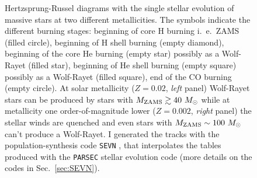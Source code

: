 \documentclass[a4paper,titlepage]{book}     	%
\newcommand{\sun}{\ensuremath{_\odot}}
\newcommand{\mzams}{M_\textup{ZAMS}}
\newcommand{\msun}{\ensuremath{M\sun}}
\begin{document}
\begin{figure}[h!]
\begin{minipage}{.49\textwidth}
	\end{minipage}
	\caption{Hertzsprung-Russel diagrams with the single stellar evolution of massive stars at two different metallicities. The symbols indicate the different burning stages: beginning of core H burning i.\ e.\ ZAMS (filled circle), beginning of H shell burning (empty diamond), beginning of the core He burning (empty star) possibly as a Wolf-Rayet (filled star), beginning of He shell burning (empty square) possibly as a Wolf-Rayet (filled square), end of the CO burning (empty circle). At solar metallicity ($Z=0.02$, \emph{left} panel) Wolf-Rayet stars can be produced by stars with $\mzams \gtrsim 40~\msun$ while at metallicity one order-of-magnitude lower ($Z=0.002$, \emph{right} panel) the stellar winds are quenched and even stars with $\mzams \sim 100~\msun$ can't produce a Wolf-Rayet. I generated the tracks with the population-synthesis code \texttt{SEVN} \cite{spera2019_mergingBBH}, that interpolates the tables produced with the \texttt{PARSEC} stellar evolution code \cite{parsec2015_chen} (more details on the codes in Sec.\ \ref{sec:SEVN}).}\label{fig:HRdiagrams}
\end{figure}
\end{document}
